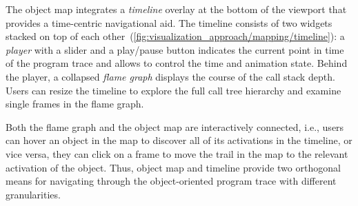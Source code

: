 The object map integrates a \emph{timeline} overlay at the bottom of the viewport that provides a time-centric navigational aid.
The timeline consists of two widgets stacked on top of each other~(\cref{fig:visualization_approach/mapping/timeline}):
a \emph{player} with a slider and a play/pause button indicates the current point in time of the program trace and allows to control the time and animation state.
Behind the player, a collapsed \emph{flame graph} displays the course of the call stack depth.
Users can resize the timeline to explore the full call tree hierarchy and examine single frames in the flame graph.

Both the flame graph and the object map are interactively connected, i.e., users can hover an object in the map to discover all of its activations in the timeline, or vice versa, they can click on a frame to move the trail in the map to the relevant activation of the object.
Thus, object map and timeline provide two orthogonal means for navigating through the object-oriented program trace with different granularities.
